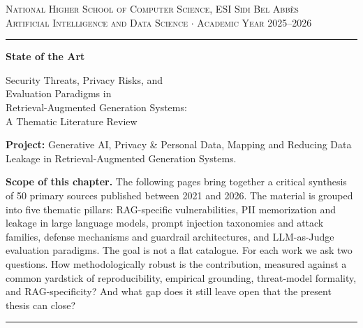 \documentclass[12pt, a4paper]{report}
\begin{document}


\begin{titlepage}
\begin{center}
\vspace*{1.2cm}
{\small\color{navy!80}\textsc{National Higher School of Computer Science, ESI Sidi Bel Abb\`{e}s}}\\[0.15cm]
{\small\color{navy!80}\textsc{Artificial Intelligence and Data Science $\cdot$ Academic Year 2025--2026}}
\vspace{0.5cm}
{\color{navy}\rule{\textwidth}{1.2pt}}
\vspace{1.6cm}

{\color{navy}\Huge\bfseries State of the Art}

\vspace{0.5cm}
{\color{navy!85}\LARGE Security Threats, Privacy Risks, and\\[0.15cm] Evaluation Paradigms in\\[0.15cm] Retrieval-Augmented Generation Systems:\\[0.15cm] A Thematic Literature Review}

\vspace{2cm}
\begin{prosebox}
{\small\textbf{Project:} Generative AI, Privacy \& Personal Data, Mapping and Reducing Data Leakage in Retrieval-Augmented Generation Systems.

\medskip
\textbf{Scope of this chapter.} The following pages bring together a critical synthesis of 50 primary sources published between 2021 and 2026. The material is grouped into five thematic pillars: RAG-specific vulnerabilities, PII memorization and leakage in large language models, prompt injection taxonomies and attack families, defense mechanisms and guardrail architectures, and LLM-as-Judge evaluation paradigms. The goal is not a flat catalogue. For each work we ask two questions. How methodologically robust is the contribution, measured against a common yardstick of reproducibility, empirical grounding, threat-model formality, and RAG-specificity? And what gap does it still leave open that the present thesis can close?}
\end{prosebox}
\vfill
{\color{navy}\rule{\textwidth}{1.2pt}}
\end{center}
\end{titlepage}
\end{document}
